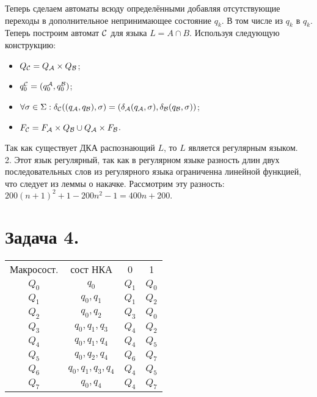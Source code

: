 \documentclass[12pt]{article}
\theoremstyle{definiton}
\theoremstyle{definition}
\theoremstyle{definition}
\def\A{{\cal A}}
\def\B{{\cal B}}
\def\C{{\cal C}}
\begin{document}
Теперь сделаем автоматы всюду определёнными добавляя отсутствующие переходы в дополнительное непринимающее состояние $q_k$. В том числе из $q_k$ в $q_k$.\\
Теперь построим автомат $\C$ для языка $L = A \cap B$. Используя следующую конструкцию:
\begin{itemize}
	\item $Q_\C = Q_\A \times Q_\B$;
	\item $q_0^{\C} = (q_0^{\A},q_0^{\B})$;
	\item $\forall \sigma \in \Sigma : \delta_\C((q_\A,q_\B), \sigma) = (\delta_\A(q_\A, \sigma), \delta_\B(q_\B, \sigma ) )$;
	\item  $F_\C = F_\A\times Q_\B \cup Q_\A \times F_\B $.
\end{itemize} 
Так как существует ДКА распознающий $L$, то $L$ является регулярным языком.\\
 
2. Этот язык регулярный, так как в регулярном языке разность длин двух последовательных слов из регулярного языка ограниченна линейной функцией, что следует из леммы о накачке. Рассмотрим эту разность: $200(n+1)^2 + 1 - 200n^2 -1 = 400n + 200.$\\

\section*{Задача 4.}

\begin{tabular}{cccc}
Макросост. & сост НКА & 0 & 1 \\
$Q_0$ & $q_0$ & $Q_1$ & $Q_0$ \\
$Q_1$ & $q_0, q_1$ & $Q_1$ & $Q_2$ \\
$Q_2$ & $q_0, q_2$ & $Q_3$ & $Q_0$ \\
$Q_3$ & $q_0, q_1, q_3$ & $Q_4$ & $Q_2$ \\
$Q_4$ & $q_0, q_1, q_4$ & $Q_4$ & $Q_5$ \\
$Q_5$ & $q_0, q_2, q_4$ & $Q_6$ & $Q_7$ \\
$Q_6$ & $q_0, q_1, q_3, q_4$ & $Q_4$ & $Q_5$ \\
$Q_7$ & $q_0, q_4$ & $Q_4$ & $Q_7$ \\
\end{tabular}
\end{document}
